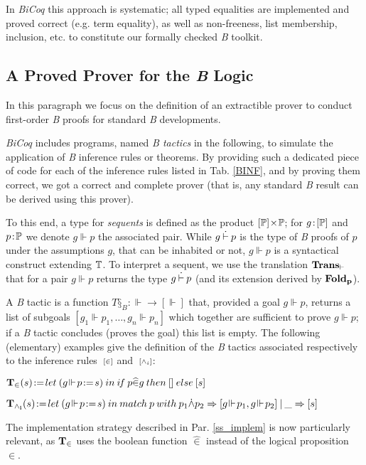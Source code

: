 \documentclass{llncs}
\begin{document}
In \emph{BiCoq} this approach is systematic; all typed equalities are implemented and proved 
correct (e.g. term equality), as well as non-freeness, list membership, inclusion, etc. to 
constitute our formally checked \emph{B} toolkit.

\subsection{A Proved Prover for the \emph{B} Logic}\label{ss_prov}

In this paragraph we focus on the definition of an extractible prover to conduct first-order 
\emph{B} proofs for standard \emph{B} developments.

\emph{BiCoq} includes programs, named \emph{B tactics} in the following, to simulate the 
application of \emph{B} inference rules or theorems. By providing such a dedicated piece of 
code for each of the inference rules listed in Tab. \ref{BINF}, and by proving them correct, 
we got a correct and complete prover (that is, any standard \emph{B} result can be derived 
using this prover). 

To this end, a type for \emph{sequents} is defined as the product $[\mathbb{P}]\!\times\!\mathbb{P}$; 
for $g\!:\![\mathbb{P}]$ and $p\!:\!\mathbb{P}$ we denote $g\!\Vdash\!p$ the associated pair. While
$g \:\dot{\vdash}\: p$ is the type of \emph{B} proofs of $p$ under the assumptions $g$, that can be 
inhabited or not, $g \Vdash p$ is a syntactical construct extending $\mathbb{T}$. To interpret a 
sequent, we use the translation $\mathbf{Trans_\vdash}$ that for a pair $g\!\Vdash\!p$ returns 
the type $g \:\dot{\vdash}\: p$ (and its extension derived by $\mathbf{Fold_p}$).

A \emph{B} tactic is a function $T§_B\!:\Vdash\to\![\Vdash]$ that, provided a goal 
$g\!\Vdash\!p$, returns a list of subgoals $[g_1\!\Vdash\!p_1,\ldots,g_n\!\Vdash\!p_n]$ which 
together are sufficient to prove $g\!\Vdash\!p$; if a \emph{B} tactic concludes (proves the 
goal) this list is empty. The following (elementary) examples give the definition of the 
\emph{B} tactics associated respectively to the inference rules $\:{\scriptstyle{[{\in}]}}$ and 
$\:{\scriptstyle{[{\land_i}]}}$:
 \begin{example}\small
$\Bcmd{T_{\in}}(s)\!:=\!let\:(g\!\Vdash\!p\!:=\!s)\:in\:
  i\:\!\!f\:p\widehat{\in}g\:then\:[]\:else\:[s]$
\end{example}
\begin{example}\small
$\Bcmd{T_{\land_i}}(s)\!:=\!let\:(g\!\Vdash\!p\!:=\!s)\:in\:
  match\:p\:with\:p_1 \pand p_2 \Rightarrow [g\!\Vdash\!p_1,g\!\Vdash\!p_2]\:|
                \:\_ \Rightarrow [s]$
\end{example}
The implementation strategy described in Par. \ref{ss_implem} is now particularly relevant, as 
$\mathbf{T_{\in}}$ uses the boolean function $\widehat{\in}$ instead of the logical proposition 
$\in$.
\end{document}
